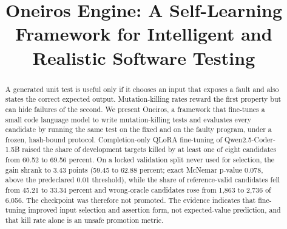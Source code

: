 \documentclass[conference,a4paper]{IEEEtran}
\newif\ifanonymous
\begin{document}
\title{Oneiros Engine: A Self-Learning Framework for Intelligent and Realistic Software Testing}

\ifanonymous
\author{\IEEEauthorblockN{Anonymous Authors}\IEEEauthorblockA{Affiliation withheld for review}}
\else
\author{
\and
{}
\and
{}
}
\fi

\maketitle

\begin{abstract}
A generated unit test is useful only if it chooses an input that exposes a fault
and also states the correct expected output. Mutation-killing rates reward the first
property but can hide failures of the second. We present Oneiros, a framework that
fine-tunes a small code language model to write mutation-killing tests and evaluates
every candidate by running the same test on the fixed and on the faulty program, under
a frozen, hash-bound protocol. Completion-only QLoRA fine-tuning of
Qwen2.5-Coder-1.5B raised the share of development targets killed by at least one of
eight candidates from 60.52 to 69.56 percent. On a locked validation split never used
for selection, the gain shrank to 3.43 points (59.45 to 62.88 percent; exact McNemar
p-value 0.078, above the predeclared 0.01 threshold), while the share of
reference-valid candidates fell from 45.21 to 33.34 percent and wrong-oracle candidates
rose from 1,863 to 2,736 of 6,056. The checkpoint was therefore not promoted. The
evidence indicates that fine-tuning improved input selection and assertion form, not
expected-value prediction, and that kill rate alone is an unsafe promotion metric.
\end{abstract}
\end{document}
